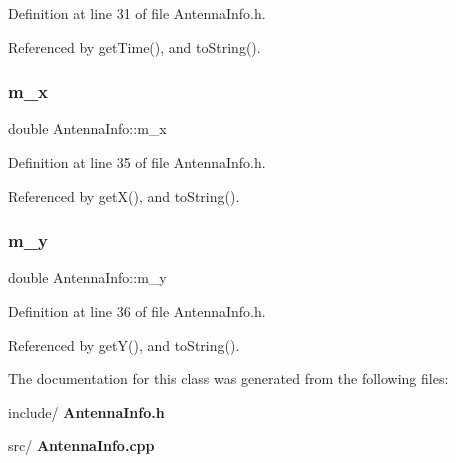 Definition at line 31 of file Antenna\+Info.\+h.



Referenced by get\+Time(), and to\+String().

\mbox{\label{class_antenna_info_a80e006159e01abca28d465e80b327992}} 
\subsubsection{m\_x}
{\footnotesize\ttfamily double Antenna\+Info\+::m\+\_\+x\hspace{0.3cm}{\ttfamily [private]}}



Definition at line 35 of file Antenna\+Info.\+h.



Referenced by get\+X(), and to\+String().

\mbox{\label{class_antenna_info_a3a9ec27d75b8d2f0d750d64b7a2a3069}} 
\subsubsection{m\_y}
{\footnotesize\ttfamily double Antenna\+Info\+::m\+\_\+y\hspace{0.3cm}{\ttfamily [private]}}



Definition at line 36 of file Antenna\+Info.\+h.



Referenced by get\+Y(), and to\+String().



The documentation for this class was generated from the following files\+:\begin{DoxyCompactItemize}
\item 
include/\textbf{ Antenna\+Info.\+h}\item 
src/\textbf{ Antenna\+Info.\+cpp}\end{DoxyCompactItemize}
